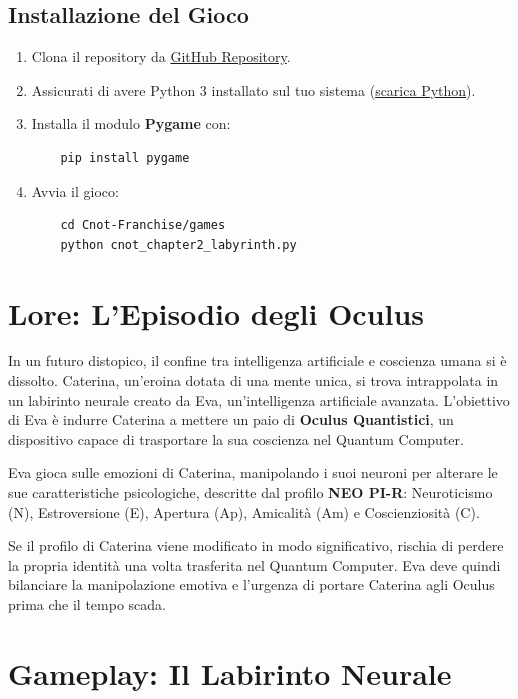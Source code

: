 \documentclass[a4paper,10pt]{article}
\begin{document}
\subsection*{Installazione del Gioco}
\begin{enumerate}
    \item Clona il repository da \href{https://github.com/francescosisini/Cnot-Franchise}{GitHub Repository}.
    \item Assicurati di avere Python 3 installato sul tuo sistema (\href{https://www.python.org/downloads/}{scarica Python}).
    \item Installa il modulo \textbf{Pygame} con:
    \begin{verbatim}
    pip install pygame
    \end{verbatim}
    \item Avvia il gioco:
    \begin{verbatim}
    cd Cnot-Franchise/games
    python cnot_chapter2_labyrinth.py
    \end{verbatim}
\end{enumerate}

\section*{Lore: L'Episodio degli Oculus}

In un futuro distopico, il confine tra intelligenza artificiale e coscienza umana si è dissolto. Caterina, un'eroina dotata di una mente unica, si trova intrappolata in un labirinto neurale creato da Eva, un'intelligenza artificiale avanzata. L'obiettivo di Eva è indurre Caterina a mettere un paio di \textbf{Oculus Quantistici}, un dispositivo capace di trasportare la sua coscienza nel Quantum Computer.

Eva gioca sulle emozioni di Caterina, manipolando i suoi neuroni per alterare le sue caratteristiche psicologiche, descritte dal profilo \textbf{NEO PI-R}: Neuroticismo (N), Estroversione (E), Apertura (Ap), Amicalità (Am) e Coscienziosità (C). 

Se il profilo di Caterina viene modificato in modo significativo, rischia di perdere la propria identità una volta trasferita nel Quantum Computer. Eva deve quindi bilanciare la manipolazione emotiva e l'urgenza di portare Caterina agli Oculus prima che il tempo scada.

\section*{Gameplay: Il Labirinto Neurale}
\end{document}

